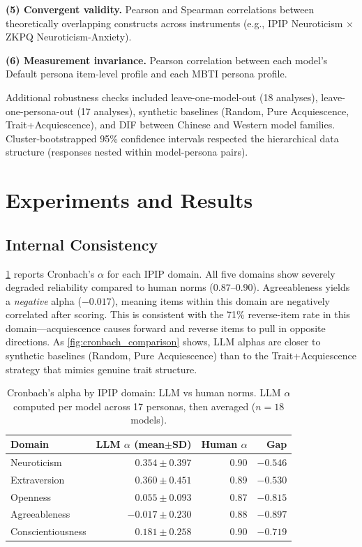 \documentclass[11pt]{article}
\begin{document}
\textbf{(5) Convergent validity.} Pearson and Spearman correlations between theoretically overlapping constructs across instruments (e.g., IPIP Neuroticism $\times$ ZKPQ Neuroticism-Anxiety).

\textbf{(6) Measurement invariance.} Pearson correlation between each model's Default persona item-level profile and each MBTI persona profile.

Additional robustness checks included leave-one-model-out (18 analyses), leave-one-persona-out (17 analyses), synthetic baselines (Random, Pure Acquiescence, Trait+Acquiescence), and DIF between Chinese and Western model families. Cluster-bootstrapped 95\% confidence intervals respected the hierarchical data structure (responses nested within model-persona pairs).

\section{Experiments and Results}

\subsection{Internal Consistency}

\cref{tab:cronbach} reports Cronbach's $\alpha$ for each IPIP domain. All five domains show severely degraded reliability compared to human norms ($0.87$--$0.90$). Agreeableness yields a \emph{negative} alpha ($-0.017$), meaning items within this domain are negatively correlated after scoring. This is consistent with the 71\% reverse-item rate in this domain---acquiescence causes forward and reverse items to pull in opposite directions. As \cref{fig:cronbach_comparison} shows, LLM alphas are closer to synthetic baselines (Random, Pure Acquiescence) than to the Trait+Acquiescence strategy that mimics genuine trait structure.

\begin{table}[t]
\centering
\caption{Cronbach's alpha by IPIP domain: LLM vs human norms. LLM $\alpha$ computed per model across 17 personas, then averaged ($n = 18$ models).}
\label{tab:cronbach}
\begin{tabular}{lrrr}
\toprule
Domain & LLM $\alpha$ (mean$\pm$SD) & Human $\alpha$ & Gap \\
\midrule
Neuroticism & $0.354 \pm 0.397$ & 0.90 & $-0.546$ \\
Extraversion & $0.360 \pm 0.451$ & 0.89 & $-0.530$ \\
Openness & $0.055 \pm 0.093$ & 0.87 & $-0.815$ \\
Agreeableness & $-0.017 \pm 0.230$ & 0.88 & $-0.897$ \\
Conscientiousness & $0.181 \pm 0.258$ & 0.90 & $-0.719$ \\
\bottomrule
\end{tabular}
\end{table}
\end{document}
